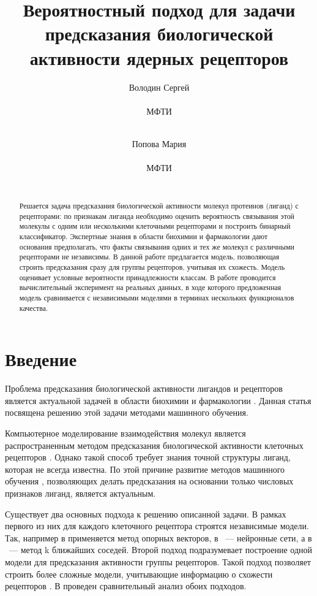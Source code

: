 \documentclass{ITaSconf}
\title{Вероятностный подход для задачи предсказания биологической активности ядерных рецепторов}
\author{
	Володин Сергей \\
	\begin{affiliation}
		МФТИ
	\end{affiliation}\\
	\email{sergei.volodin@phystech.edu}
	\and
	Попова Мария \\
	\begin{affiliation}
		МФТИ
	\end{affiliation}\\
	\email{maria\_popova@phystech.edu}
}
\begin{document}
	\maketitle
	\begin{abstract}
Решается задача предсказания биологической активности молекул протеинов (лиганд) с рецепторами: по признакам лиганда необходимо оценить вероятность связывания этой молекулы с одним или несколькими клеточными рецепторами и построить бинарный классификатор. Экспертные знания в области биохимии и фармакологии дают основания предполагать, что факты связывания одних и тех же молекул с различными рецепторами не независимы. В данной работе предлагается модель, позволяющая строить предсказания сразу для группы рецепторов, учитывая их схожесть. Модель оценивает условные вероятности принадлежности классам. В работе проводится вычислительный эксперимент на реальных данных, в ходе которого предложенная модель сравнивается с независимыми моделями в терминах нескольких функционалов качества.
	\end{abstract}

\section{Введение}
Проблема предсказания биологической активности лигандов и рецепторов является актуальной задачей в области биохимии и фармакологии \cite{hornak, Myint2012, Myint2015, vinay2008, Zhengjun5ht1a, laurent2008}. Данная статья посвящена решению этой задачи методами машинного обучения.

Компьютерное моделирование взаимодействия молекул является распространенным методом предсказания биологической активности клеточных рецепторов \cite{vinay2008, hornak}. Однако такой способ требует знания точной структуры лиганд, которая не всегда известна. По этой причине развитие методов машинного обучения \cite{peter1998}, позволяющих делать предсказания на основании только числовых признаков лиганд, является актуальным.

Существует два основных подхода к решению описанной задачи. В рамках первого из них для каждого клеточного рецептора строятся независимые модели. Так, например в \cite{svm, Zhengjun5ht1a} применяется метод опорных векторов, в \cite{Myint2012, Myint2015}~--- нейронные сети, а в \cite{scott2006}~--- метод k ближайших соседей. Второй подход подразумевает построение одной модели для предсказания активности группы рецепторов. Такой подход позволяет строить более сложные модели, учитывающие информацию о схожести рецепторов \cite{laurent2008}. В \cite{popova1} проведен сравнительный анализ обоих подходов.
\end{document}
